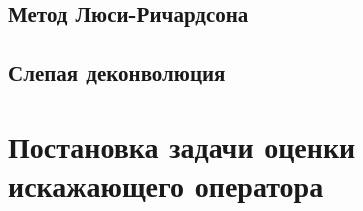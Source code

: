 \subsection{Метод Люси-Ричардсона}
\subsection{Слепая деконволюция}


\section{Постановка задачи оценки искажающего оператора}

